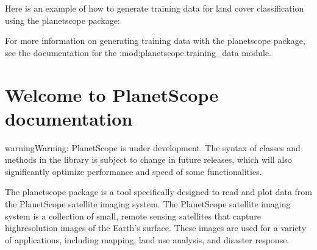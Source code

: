 \documentclass[letterpaper,10pt,english]{sphinxmanual}
\let\sphinxpxdimen\pdfpxdimen\else\newdimen\sphinxpxdimen
\begin{document}
\sphinxAtStartPar
Here is an example of how to generate training data for land cover classification using the planetscope package:

\begin{sphinxVerbatim}[commandchars=\\\{\}]
   
   
  
   
\end{sphinxVerbatim}

\sphinxAtStartPar
For more information on generating training data with the planetscope package, see the documentation for the :mod:planetscope.training\_data module.


\chapter{Welcome to PlanetScope documentation}
\label{\detokenize{index:welcome-to-planetscope-documentation}}
\begin{sphinxadmonition}{warning}{Warning:}
\sphinxAtStartPar
PlanetScope is under development. The syntax of classes and methods in the library is subject to change in future releases, which will also significantly optimize performance and speed of some functionalities.
\end{sphinxadmonition}

\noindent{\sphinxincludegraphics[width=400\sphinxpxdimen]{{planetscope}.png}\hspace*{\fill}}

\sphinxAtStartPar
The planetscope package is a tool specifically designed to read and plot data from the PlanetScope satellite imaging system. The PlanetScope satellite imaging system is a collection of small, remote sensing satellites that capture high\sphinxhyphen{}resolution images of the Earth’s surface. These images are used for a variety of applications, including mapping, land use analysis, and disaster response.
\end{document}
